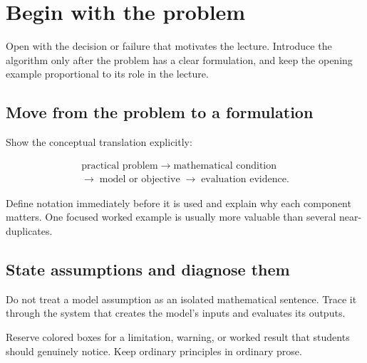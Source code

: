 \section{Begin with the problem}

Open with the decision or failure that motivates the lecture. Introduce the algorithm only after the problem has a clear formulation, and keep the opening example proportional to its role in the lecture.


\subsection{Move from the problem to a formulation}

Show the conceptual translation explicitly:

\[
\begin{gathered}
\text{practical problem}\;\longrightarrow\;\text{mathematical condition}\\[-1mm]
\longrightarrow\;\text{model or objective}\;\longrightarrow\;\text{evaluation evidence}.
\end{gathered}
\]

Define notation immediately before it is used and explain why each component matters. One focused worked example is usually more valuable than several near-duplicates.

\begin{widepar}
\centering

\end{widepar}

\subsection{State assumptions and diagnose them}

Do not treat a model assumption as an isolated mathematical sentence. Trace it through the system that creates the model's inputs and evaluates its outputs.

\begin{cautionbox}
Reserve colored boxes for a limitation, warning, or worked result that students should genuinely notice. Keep ordinary principles in ordinary prose.
\end{cautionbox}

